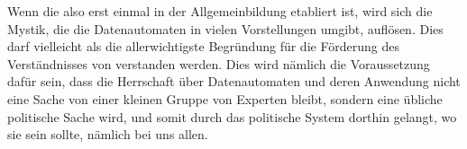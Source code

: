 {Wenn die  also erst einmal in der Allgemeinbildung etabliert ist, wird sich die Mystik, die die Datenautomaten in vielen Vorstellungen umgibt, auflösen. Dies darf vielleicht als die allerwichtigste Begründung für die Förderung des Verständnisses von  verstanden werden. Dies wird nämlich die Voraussetzung dafür sein, dass die Herrschaft über Datenautomaten und deren Anwendung nicht eine Sache von einer kleinen Gruppe von Experten bleibt, sondern eine übliche politische Sache wird, und somit durch das politische System dorthin gelangt, wo sie sein sollte, nämlich bei uns allen.
}
